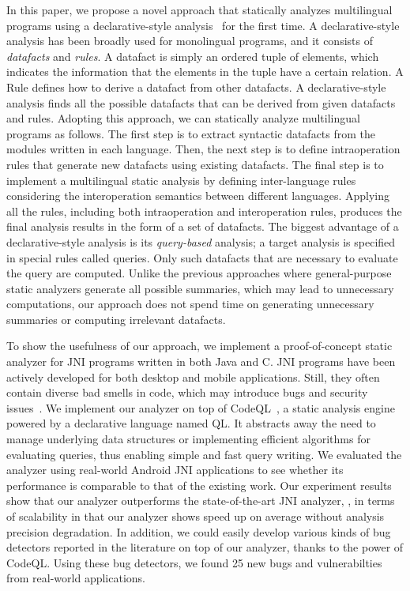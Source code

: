 In this paper, we propose a novel approach that statically analyzes
multilingual programs using a declarative-style analysis~\cite{doop} for the first time.
A declarative-style analysis has been broadly used for monolingual programs,
and it consists of \textit{datafacts} and \textit{rules}.
A datafact is simply an ordered tuple of elements, which indicates the
information that the elements in the tuple have a certain relation.
A Rule defines how to derive a datafact from other datafacts.
A declarative-style analysis finds all the possible datafacts that can
be derived from given datafacts and rules.
Adopting this approach, we can statically analyze multilingual programs as follows.
The first step is to extract syntactic datafacts from the modules written in each language.
Then, the next step is to define intraoperation rules that
generate new datafacts using existing datafacts.
The final step is to implement a multilingual static analysis by defining
inter-language rules considering the interoperation semantics between different languages. 
Applying all the rules, including both intraoperation
and interoperation rules, produces the final analysis results in
the form of a set of datafacts.  The biggest advantage of a declarative-style analysis is its
\textit{query-based} analysis; a target analysis is specified in
special rules called queries. Only such datafacts that are
necessary to evaluate the query are computed.
Unlike the previous approaches where general-purpose static
analyzers generate all possible summaries, which may lead to
unnecessary computations, our approach does not spend time
on generating unnecessary summaries or computing irrelevant datafacts.


To show the usefulness of our approach, we implement a proof-of-concept static
analyzer for JNI programs written in both Java and C.
JNI programs have been actively developed for both desktop and mobile
applications. Still, they often contain diverse bad smells in code,
which may introduce bugs and security
issues~\cite{nishiwaki2012sean, grichi2019state, abidi2019behind, abidi2021multi}.
We implement our analyzer on top of CodeQL~\cite{codeql}, a
static analysis engine powered by a declarative language named QL.
It abstracts away the need to manage underlying data structures or implementing
efficient algorithms for evaluating queries, thus enabling simple and fast query writing.
We evaluated the analyzer using real-world Android JNI applications
to see whether its performance is comparable to that of the existing work.
Our experiment results show that our analyzer outperforms the
state-of-the-art JNI analyzer, \jnsaf, in terms of scalability in that our analyzer
shows  speed up on average without analysis precision degradation.
In addition,  we could easily develop various kinds of bug detectors
reported in the literature on top of our analyzer, thanks to the power of CodeQL.
Using these bug detectors, we found 25 new bugs and
vulnerabilties from real-world applications.

